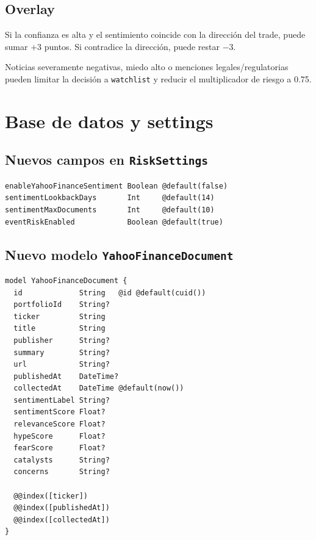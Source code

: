 \documentclass[11pt,letterpaper]{article}
\begin{document}
\subsection{Overlay}

Si la confianza es alta y el sentimiento coincide con la direcci\'on del trade,
puede sumar $+3$ puntos. Si contradice la direcci\'on, puede restar $-3$.

Noticias severamente negativas, miedo alto o menciones legales/regulatorias
pueden limitar la decisi\'on a \texttt{watchlist} y reducir el multiplicador de
riesgo a 0.75.

\section{Base de datos y settings}

\subsection{Nuevos campos en \texttt{RiskSettings}}

\begin{lstlisting}
enableYahooFinanceSentiment Boolean @default(false)
sentimentLookbackDays       Int     @default(14)
sentimentMaxDocuments       Int     @default(10)
eventRiskEnabled            Boolean @default(true)
\end{lstlisting}

\subsection{Nuevo modelo \texttt{YahooFinanceDocument}}

\begin{lstlisting}
model YahooFinanceDocument {
  id             String   @id @default(cuid())
  portfolioId    String?
  ticker         String
  title          String
  publisher      String?
  summary        String?
  url            String?
  publishedAt    DateTime?
  collectedAt    DateTime @default(now())
  sentimentLabel String?
  sentimentScore Float?
  relevanceScore Float?
  hypeScore      Float?
  fearScore      Float?
  catalysts      String?
  concerns       String?

  @@index([ticker])
  @@index([publishedAt])
  @@index([collectedAt])
}
\end{lstlisting}

\end{document}
